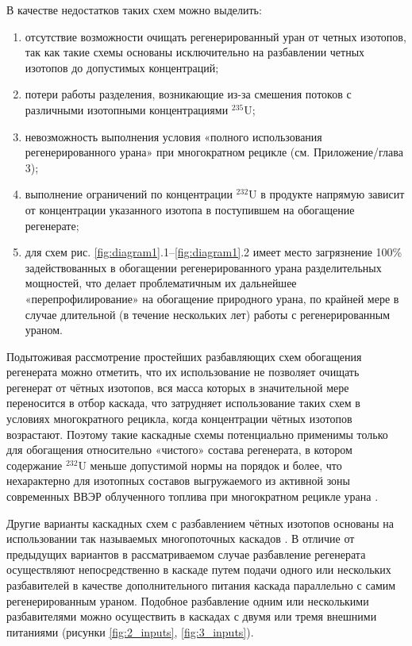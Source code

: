 В качестве недостатков таких схем можно выделить:
\begin{enumerate}
  \item отсутствие возможности очищать регенерированный уран от четных изотопов, так как такие схемы основаны исключительно на разбавлении четных изотопов до допустимых концентраций;
  \item потери работы разделения, возникающие из-за смешения потоков с различными изотопными концентрациями $^{235}$U;
  \item невозможность выполнения условия «полного использования регенерированного урана» при многократном рецикле \cite{smirnovApplyingEnrichmentCapacities2018} (см. Приложение/глава 3);
  \item выполнение ограничений по концентрации $^{232}$U в продукте напрямую зависит от концентрации указанного изотопа в поступившем на обогащение регенерате;
  \item для схем рис. \ref{fig:diagram1}.1--\ref{fig:diagram1}.2 имеет место загрязнение 100\% задействованных в обогащении регенерированного урана разделительных мощностей, что делает проблематичным их дальнейшее «перепрофилирование» на обогащение природного урана, по крайней мере в случае длительной (в течение нескольких лет) работы с регенерированным ураном.
\end{enumerate}

Подытоживая рассмотрение простейших разбавляющих схем обогащения регенерата можно отметить, что их использование не позволяет очищать регенерат от чётных изотопов, вся масса которых в значительной мере переносится в отбор каскада, что затрудняет использование таких схем в условиях многократного рецикла, когда концентрации чётных изотопов возрастают. Поэтому такие каскадные схемы потенциально применимы только для обогащения относительно «чистого» состава регенерата, в котором содержание $^{232}$U меньше допустимой нормы на порядок и более, что нехарактерно для изотопных составов выгружаемого из активной зоны современных ВВЭР облученного топлива при многократном рецикле урана \cite{bormanTehnikoekonomicheskiyAnalizVozmozhnyh2012}. 

Другие варианты каскадных схем с разбавлением чётных изотопов основаны на использовании так называемых многопоточных каскадов \cite{sulaberidzeQuasiidealCascadesAdditional2006}. В отличие от предыдущих вариантов в рассматриваемом случае разбавление регенерата осуществляют непосредственно в каскаде путем подачи одного или нескольких разбавителей в качестве дополнительного питания каскада параллельно с самим регенерированным ураном. Подобное разбавление одним или несколькими разбавителями можно осуществить в каскадах с двумя или тремя внешними питаниями (рисунки \ref{fig:2_inputs}, \ref{fig:3_inputs}).

